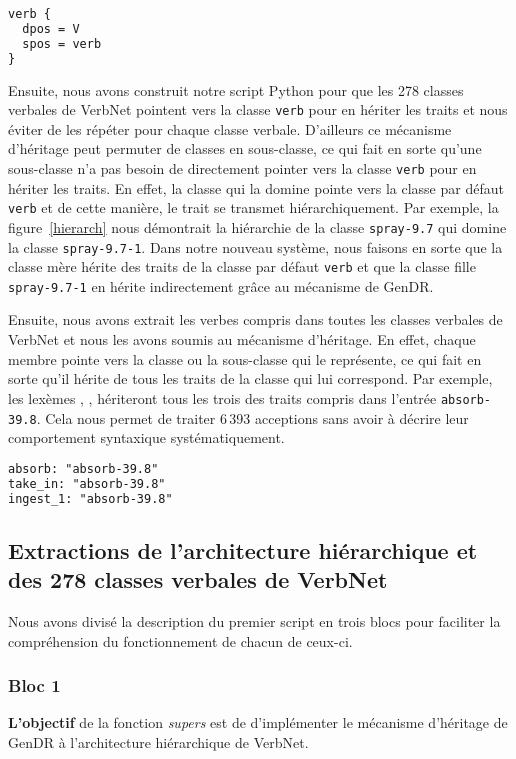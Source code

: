 \begin{lstlisting}[language=XML, caption=Classe par défaut des verbes]
verb {
  dpos = V
  spos = verb
}
\end{lstlisting}

Ensuite, nous avons construit notre script Python pour que les 278 classes verbales de VerbNet pointent vers la classe \texttt{verb} pour en hériter les traits et nous éviter de les répéter pour chaque classe verbale. D'ailleurs ce mécanisme d'héritage peut permuter de classes en sous-classe, ce qui fait en sorte qu'une sous-classe n'a pas besoin de directement pointer vers la classe \texttt{verb} pour en hériter les traits. En effet, la classe qui la domine pointe vers la classe par défaut \texttt{verb} et de cette manière, le trait se transmet hiérarchiquement. Par exemple, la figure~\ref{hierarch} nous démontrait la hiérarchie de la classe \texttt{spray-9.7} qui domine la classe \texttt{spray-9.7-1}. Dans notre nouveau système, nous faisons en sorte que la classe mère hérite des traits de la classe par défaut \texttt{verb} et que la classe fille \texttt{spray-9.7-1} en hérite indirectement grâce au mécanisme de GenDR.

Ensuite, nous avons extrait les verbes compris dans toutes les classes verbales de VerbNet et nous les avons soumis au mécanisme d'héritage. En effet, chaque membre pointe vers la classe ou la sous-classe qui le représente, ce qui fait en sorte qu'il hérite de tous les traits de la classe qui lui correspond. Par exemple, les lexèmes , ,  hériteront tous les trois des traits compris dans l'entrée \texttt{absorb-39.8}. Cela nous permet de traiter 6\,393 acceptions sans avoir à décrire leur comportement syntaxique systématiquement.

\begin{lstlisting}[language=XML]
absorb: "absorb-39.8"
take_in: "absorb-39.8"
ingest_1: "absorb-39.8"
\end{lstlisting}

\subsection{Extractions de l'architecture hiérarchique et des 278 classes verbales de VerbNet}

Nous avons divisé la description du premier script en trois blocs pour faciliter la compréhension du fonctionnement de chacun de ceux-ci.

\subsubsection{Bloc 1}
\textbf{L'objectif} de la fonction \emph{supers} est de d'implémenter le mécanisme d'héritage de GenDR à l'architecture hiérarchique de VerbNet.

